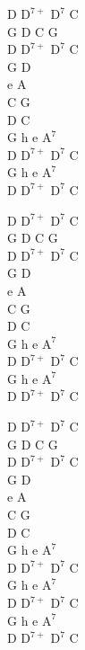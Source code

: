 \begin{chordw}
    D $\mathrm{D^{7+}}$ $\mathrm{D^7}$ C\\
    G D C G\\
    D $\mathrm{D^{7+}}$ $\mathrm{D^7}$ C\\
    G D\\
    e A\\
    C G\\
    D C\\
    G h e $\mathrm{A^7}$\\
    D $\mathrm{D^{7+}}$ $\mathrm{D^7}$ C\\
    G h e $\mathrm{A^7}$\\
    D $\mathrm{D^{7+}}$ $\mathrm{D^7}$ C

    D $\mathrm{D^{7+}}$ $\mathrm{D^7}$ C\\
    G D C G\\
    D $\mathrm{D^{7+}}$ $\mathrm{D^7}$ C\\
    G D\\
    e A\\
    C G\\
    D C\\
    G h e $\mathrm{A^7}$\\
    D $\mathrm{D^{7+}}$ $\mathrm{D^7}$ C\\
    G h e $\mathrm{A^7}$\\
    D $\mathrm{D^{7+}}$ $\mathrm{D^7}$ C

    D $\mathrm{D^{7+}}$ $\mathrm{D^7}$ C\\
    G D C G\\
    D $\mathrm{D^{7+}}$ $\mathrm{D^7}$ C\\
    G D\\
    e A\\
    C G\\
    D C\\
    G h e $\mathrm{A^7}$\\
    D $\mathrm{D^{7+}}$ $\mathrm{D^7}$ C\\
    G h e $\mathrm{A^7}$\\
    D $\mathrm{D^{7+}}$ $\mathrm{D^7}$ C\\
    G h e $\mathrm{A^7}$\\
    D $\mathrm{D^{7+}}$ $\mathrm{D^7}$ C
\end{chordw}
